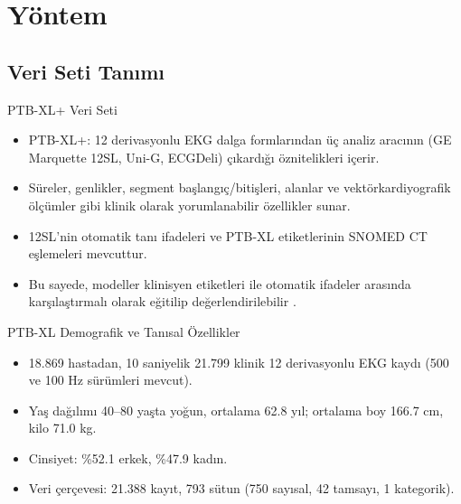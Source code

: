 \documentclass[aspectratio=169]{beamer}
\begin{document}
\section{Yöntem}

\subsection{Veri Seti Tanımı}

\begin{frame}{PTB-XL+ Veri Seti}
	\begin{itemize}
		\item PTB-XL+: 12 derivasyonlu EKG dalga formlarından üç analiz aracının (GE Marquette 12SL, Uni-G, ECGDeli) çıkardığı öznitelikleri içerir.
		\item Süreler, genlikler, segment başlangıç/bitişleri, alanlar ve vektörkardiyografik ölçümler gibi klinik olarak yorumlanabilir özellikler sunar.
		\item 12SL'nin otomatik tanı ifadeleri ve PTB-XL etiketlerinin SNOMED CT eşlemeleri mevcuttur.
		\item Bu sayede, modeller klinisyen etiketleri ile otomatik ifadeler arasında karşılaştırmalı olarak eğitilip değerlendirilebilir \cite{wagner2023-ptbxlplus}.
	\end{itemize}
\end{frame}

\begin{frame}{PTB-XL Demografik ve Tanısal Özellikler}
	\begin{itemize}
		\item 18.869 hastadan, 10 saniyelik 21.799 klinik 12 derivasyonlu EKG kaydı (500 ve 100 Hz sürümleri mevcut).
		\item Yaş dağılımı 40--80 yaşta yoğun, ortalama 62.8 yıl; ortalama boy 166.7 cm, kilo 71.0 kg.
		\item Cinsiyet: \%52.1 erkek, \%47.9 kadın.
		\item Veri çerçevesi: 21.388 kayıt, 793 sütun (750 sayısal, 42 tamsayı, 1 kategorik).
	\end{itemize}
\end{frame}
\end{document}
